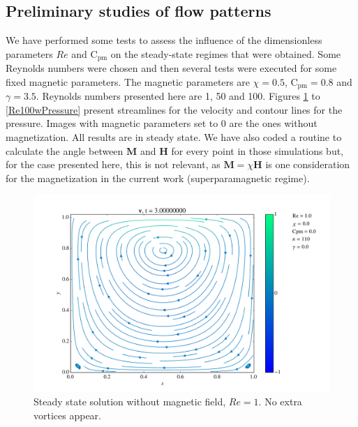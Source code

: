 \documentclass[journal]{IEEEtran}
\begin{document}
\subsection{Preliminary studies of flow patterns}
We have performed some tests to assess the influence of the dimensionless parameters $\mathit{Re}$ and $\mathrm{C}_\mathrm{pm}$ on the steady-state regimes that were obtained.  Some Reynolds numbers were chosen and then several tests were executed for some fixed magnetic parameters. The magnetic parameters are $\chi=0.5$, $\mathrm{C}_\mathrm{pm}=0.8$ and $\gamma=3.5$. Reynolds numbers presented here are 1, 50 and 100. Figures \ref{Re001nVectorField} to \ref{Re100wPressure} present streamlines for the velocity and contour lines for the pressure. Images with magnetic parameters set to 0 are the ones without magnetization. All results are in steady state. We have also coded a routine to calculate the angle between $\mathbf{M}$ and $\mathbf{H}$ for every point in those simulations but, for the case presented here, this is not relevant, as $\mathbf{M}=\chi\mathbf{H}$ is one consideration for the magnetization in the current work (superparamagnetic regime).

\begin{figure}[!t]
\centering
\includegraphics[width=\linewidth]{figures/Re001/n/vectorField}
\caption{Steady state solution without magnetic field, $\mathit{Re}=1$. No extra vortices appear.\label{Re001nVectorField}}
\end{figure}
\end{document}
